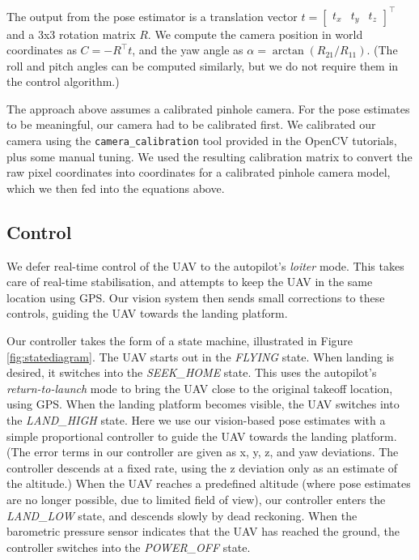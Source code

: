 \documentclass[10pt]{scrartcl} %
\begin{document}

The output from the pose estimator is a translation vector
$t = \begin{bmatrix} t_x & t_y & t_z \end{bmatrix}^\top$
and a 3x3 rotation matrix $R$. We compute the camera position in world
coordinates as $C = -R^\top t$, and the yaw angle as
$\alpha = \arctan(R_{21} / R_{11})$. (The roll and pitch angles can be computed
similarly, but we do not require them in the control algorithm.)

The approach above assumes a calibrated pinhole camera. For the pose estimates
to be meaningful, our camera had to be calibrated first. We calibrated our
camera using the {\tt camera\_calibration} tool provided in the OpenCV
tutorials, plus some manual tuning. We used the resulting calibration matrix to
convert the raw pixel coordinates into coordinates for a calibrated pinhole
camera model, which we then fed into the equations above.


\subsection{Control}

We defer real-time control of the UAV to the autopilot's \textit{loiter} mode.
This takes care of real-time stabilisation, and attempts to keep the UAV in the
same location using GPS. Our vision system then sends small corrections to
these controls, guiding the UAV towards the landing platform.


Our controller takes the form of a state machine, illustrated in Figure
\ref{fig:statediagram}. The UAV starts out in the \textit{FLYING} state. When
landing is desired, it switches into the \textit{SEEK\_HOME} state. This uses
the autopilot's \textit{return-to-launch} mode to bring the UAV close to the
original takeoff location, using GPS. When the landing platform becomes
visible, the UAV switches into the \textit{LAND\_HIGH} state. Here we use our
vision-based pose estimates with a simple proportional controller to guide the
UAV towards the landing platform. (The error terms in our controller are given
as x, y, z, and yaw deviations. The controller descends at a fixed rate, using
the z deviation only as an estimate of the altitude.) When the UAV reaches a
predefined altitude (where pose estimates are no longer possible, due to
limited field of view), our controller enters the \textit{LAND\_LOW} state, and
descends slowly by dead reckoning. When the barometric pressure sensor indicates 
that the UAV has reached the ground, the controller switches into the
\textit{POWER\_OFF} state.
\end{document}
